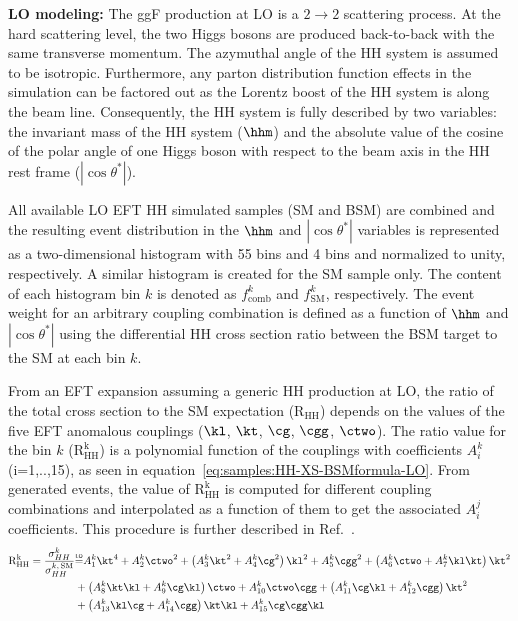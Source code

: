 {\bf{LO modeling:}} The ggF production at LO is a $2\to2$ scattering process. At the hard scattering level, the two Higgs bosons are produced back-to-back with the same transverse momentum. The azymuthal angle of the HH system is assumed to be isotropic. Furthermore, any parton distribution function effects in the simulation can be factored out as the Lorentz boost of the HH system is along the beam line. Consequently, the HH system is fully described by two variables: the invariant mass of the HH system ($\hhm$) and the absolute value of the cosine of the polar angle of one Higgs boson with respect to the beam axis in the HH rest frame ($|\cos\theta^{*}|$).

All available LO EFT HH simulated samples (SM and BSM) are combined and the resulting event distribution in the $\hhm$ and $|\cos\theta^{*}|$ variables is represented as a two-dimensional histogram with 55 bins and 4 bins and normalized to unity, respectively. A similar histogram is created for the SM sample only. The content of each histogram bin $k$ is denoted as $f^k_\text{comb}$ and $f^k_\text{SM}$, respectively. The event weight for an arbitrary coupling combination is defined as a function of $\hhm$ and $|\cos\theta^{*}|$ using the differential HH cross section ratio between the BSM target to the SM at each bin $k$.

From an EFT expansion assuming a generic HH production at LO, the ratio of the total cross section to the SM expectation ($\mathrm{R_{HH}}$) depends on the values of the five EFT anomalous couplings ($\kl$, $\kt$, $\cg$, $\cgg$, $\ctwo$). The ratio value for the bin $k$ ($\mathrm{R_{HH}^k}$) is a polynomial function of the couplings with coefficients $A_i^{k}$ (i=1,..,15), as seen in equation~\ref{eq:samples:HH-XS-BSMformula-LO}. From generated events, the value of $\mathrm{R_{HH}^k}$ is computed for different coupling combinations and interpolated as a function of them to get the associated $A_i^{j}$ coefficients. This procedure is further described in Ref.~\cite{Carvalho:2017vnu}. 
\begin{equation}
\label{eq:samples:HH-XS-BSMformula-LO}
\begin{split}
 \mathrm{R_{HH}^k} = \dfrac{\sigma_{HH}^k}{\sigma_{HH}^{k,\,\text{SM}}} & {\mathrel{\overset{\makebox[0pt]{\mbox{\normalfont\tiny\sffamily LO}}}{=}}}
 A_1^k \kt^4 +
 A_2^k \ctwo^2 +
 \left(A_3^k \kt^2 + A_4^k \cg^2 \right) \kl^2 + 
 A_5^k \cgg^2 + 
 \left(A_6^k \ctwo + A_7^k \kl\kt \right) \kt^2 \\ & + 
 \left(A_8^k \kt\kl + A_9^k \cg\kl \right) \ctwo  + 
 A_{10}^k \ctwo\cgg + 
 \left(A_{11}^k\cg\kl + A_{12}^k\cgg \right) \kt^2 \\ & + 
 \left(A_{13}^k\kl\cg + A_{14}^k\cgg \right) \kt\kl + 
 A_{15}^k \cg\cgg\kl
 \end{split}
\end{equation}

